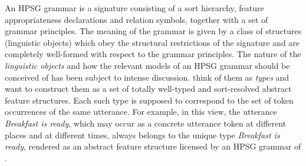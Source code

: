 \documentclass[output=paper,biblatex,babelshorthands,newtxmath,draftmode,colorlinks,citecolor=brown]{langscibook}
\begin{document}
{An HPSG grammar is a signature\label{formal:page-signature} consisting of a sort hierarchy, feature
appropriateness declarations and relation symbols, together with a set
of grammar principles. The meaning of the grammar is given by a class
of structures (linguistic objects) which obey the structural
restrictions of the signature and are completely well-formed with
respect to the grammar principles. The nature of the \emph{linguistic
  objects} and how the relevant models of an HPSG grammar should be
conceived of has been subject to intense
discussion. \citet[8--9]{PollardSag1994} think of them as \emph{types} and
want to construct them as a set of totally well-typed and
sort-resolved abstract feature structures. Each such type is supposed
to correspond to the set of token occurrences of the same utterance. For
example, in this view, the  utterance \emph{Breakfast is ready},
which may occur as a concrete utterance token
at different places and at different times, always belongs to the
unique type \emph{Breakfast is ready}, rendered as an abstract feature
structure licensed by an HPSG grammar of .

}
\end{document}
